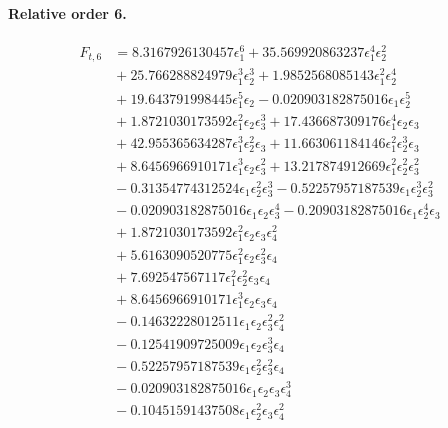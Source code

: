 \documentclass[10pt]{article}
\begin{document}
\paragraph{Relative order 6.}
\begin{align*}
F_{t,6} &= 8.3167926130457 \epsilon_{1}^{6} + 35.569920863237 \epsilon_{1}^{4} \epsilon_{2}^{2} \\
&{}  + 25.766288824979 \epsilon_{1}^{3} \epsilon_{2}^{3} + 1.9852568085143 \epsilon_{1}^{2} \epsilon_{2}^{4} \\
&{}  + 19.643791998445 \epsilon_{1}^{5} \epsilon_{2} - 0.020903182875016 \epsilon_{1} \epsilon_{2}^{5} \\
&{}  + 1.8721030173592 \epsilon_{1}^{2} \epsilon_{2} \epsilon_{3}^{3} + 17.436687309176 \epsilon_{1}^{4} \epsilon_{2} \epsilon_{3} \\
&{}  + 42.955365634287 \epsilon_{1}^{3} \epsilon_{2}^{2} \epsilon_{3} + 11.663061184146 \epsilon_{1}^{2} \epsilon_{2}^{3} \epsilon_{3} \\
&{}  + 8.6456966910171 \epsilon_{1}^{3} \epsilon_{2} \epsilon_{3}^{2} + 13.217874912669 \epsilon_{1}^{2} \epsilon_{2}^{2} \epsilon_{3}^{2} \\
&{}  - 0.31354774312524 \epsilon_{1} \epsilon_{2}^{2} \epsilon_{3}^{3} - 0.52257957187539 \epsilon_{1} \epsilon_{2}^{3} \epsilon_{3}^{2} \\
&{}  - 0.020903182875016 \epsilon_{1} \epsilon_{2} \epsilon_{3}^{4} - 0.20903182875016 \epsilon_{1} \epsilon_{2}^{4} \epsilon_{3} \\
&{}  + 1.8721030173592 \epsilon_{1}^{2} \epsilon_{2} \epsilon_{3} \epsilon_{4}^{2} \\
&{}  + 5.6163090520775 \epsilon_{1}^{2} \epsilon_{2} \epsilon_{3}^{2} \epsilon_{4} \\
&{}  + 7.692547567117 \epsilon_{1}^{2} \epsilon_{2}^{2} \epsilon_{3} \epsilon_{4} \\
&{}  + 8.6456966910171 \epsilon_{1}^{3} \epsilon_{2} \epsilon_{3} \epsilon_{4} \\
&{}  - 0.14632228012511 \epsilon_{1} \epsilon_{2} \epsilon_{3}^{2} \epsilon_{4}^{2} \\
&{}  - 0.12541909725009 \epsilon_{1} \epsilon_{2} \epsilon_{3}^{3} \epsilon_{4} \\
&{}  - 0.52257957187539 \epsilon_{1} \epsilon_{2}^{2} \epsilon_{3}^{2} \epsilon_{4} \\
&{}  - 0.020903182875016 \epsilon_{1} \epsilon_{2} \epsilon_{3} \epsilon_{4}^{3} \\
&{}  - 0.10451591437508 \epsilon_{1} \epsilon_{2}^{2} \epsilon_{3} \epsilon_{4}^{2} \\

\end{align*}
\end{document}
